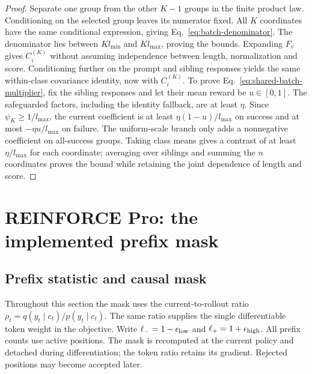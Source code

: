 \begin{proof}
Separate one group from the other $K-1$ groups in the finite product law.
Conditioning on the selected group leaves its numerator fixed. All $K$
coordinates have the same conditional expression, giving
Eq.~\eqref{eq:batch-denominator}. The denominator lies between
$Kl_{\min}$ and $Kl_{\max}$, proving the bounds. Expanding $F_v$ gives
$C_i^{(K)}$ without assuming independence between length, normalization and
score. Conditioning further on the prompt and sibling responses yields the
same within-class covariance identity, now with $C_i^{(K)}$.
To prove Eq.~\eqref{eq:shared-batch-multiplier}, fix the sibling responses
and let their mean reward be $u\in[0,1]$. The safeguarded factors, including
the identity fallback, are at least $\eta$. Since
$\psi_K\ge1/l_{\max}$, the current coefficient is at least
$\eta(1-u)/l_{\max}$ on success and at most
$-\eta u/l_{\max}$ on failure. The uniform-scale branch only adds a
nonnegative coefficient on all-success groups. Taking class means gives a
contrast of at least $\eta/l_{\max}$ for each coordinate; averaging over
siblings and summing the $n$ coordinates proves the bound while retaining
the joint dependence of length and score.

\end{proof}

\section{REINFORCE Pro: the implemented prefix mask}
\subsection{Prefix statistic and causal mask}
\label{sec:reinforce-pro}
\label{sec:prefix-is}

Throughout this section the mask uses the current-to-rollout ratio
$\rho_t=q(y_t\mid c_t)/p(y_t\mid c_t)$. The same ratio supplies the
single differentiable token weight in the objective. Write
$\ell_-=1-\epsilon_{\mathrm{low}}$ and $\ell_+=1+\epsilon_{\mathrm{high}}$.
All prefix counts use active positions. The mask is recomputed at the
current policy and detached during differentiation; the token ratio
retains its gradient. Rejected positions may become accepted later.

